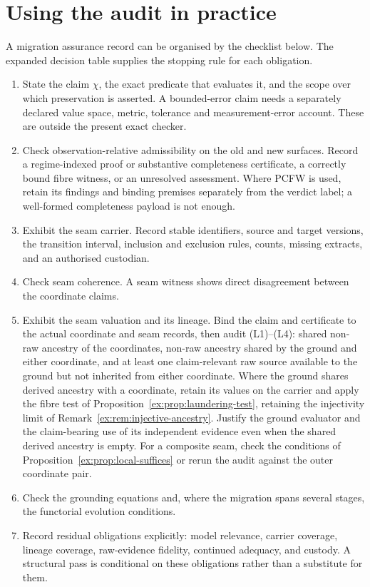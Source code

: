 \documentclass[11pt]{article}
\theoremstyle{definition}
\begin{document}
\section{Using the audit in practice}\label{ex:sec:practice}
A migration assurance record can be organised by the checklist below. The expanded decision table supplies the stopping rule for each obligation.
\begin{enumerate}
\item State the claim $\chi$, the exact predicate that evaluates it, and the scope over which preservation is asserted. A bounded-error claim needs a separately declared value space, metric, tolerance and measurement-error account. These are outside the present exact checker.
\item Check observation-relative admissibility on the old and new surfaces. Record a regime-indexed proof or substantive completeness certificate, a correctly bound fibre witness, or an unresolved assessment. Where PCFW is used, retain its findings and binding premises separately from the verdict label; a well-formed completeness payload is not enough.
\item Exhibit the seam carrier. Record stable identifiers, source and target versions, the transition interval, inclusion and exclusion rules, counts, missing extracts, and an authorised custodian.
\item Check seam coherence. A seam witness shows direct disagreement between the coordinate claims.
\item Exhibit the seam valuation and its lineage. Bind the claim and certificate to the actual coordinate and seam records, then audit (L1)--(L4): shared non-raw ancestry of the coordinates, non-raw ancestry shared by the ground and either coordinate, and at least one claim-relevant raw source available to the ground but not inherited from either coordinate. Where the ground shares derived ancestry with a coordinate, retain its values on the carrier and apply the fibre test of Proposition~\ref{ex:prop:laundering-test}, retaining the injectivity limit of Remark~\ref{ex:rem:injective-ancestry}. Justify the ground evaluator and the claim-bearing use of its independent evidence even when the shared derived ancestry is empty. For a composite seam, check the conditions of Proposition~\ref{ex:prop:local-suffices} or rerun the audit against the outer coordinate pair.
\item Check the grounding equations and, where the migration spans several stages, the functorial evolution conditions.
\item Record residual obligations explicitly: model relevance, carrier coverage, lineage coverage, raw-evidence fidelity, continued adequacy, and custody. A structural pass is conditional on these obligations rather than a substitute for them.
\end{enumerate}
\end{document}
